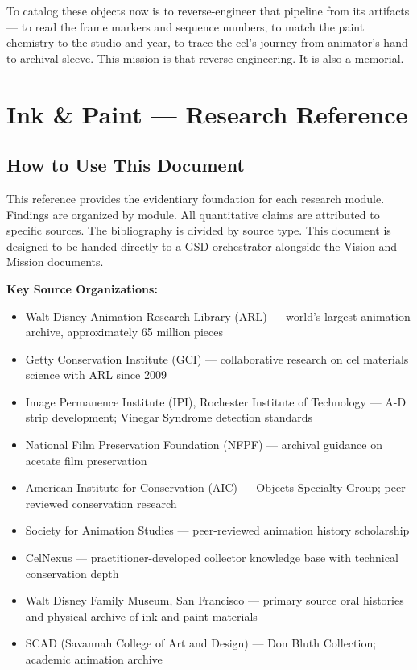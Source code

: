 \documentclass[11pt,letterpaper]{article}
\newcommand{\stageheader}[2]{%
  \noindent\colorbox{#2}{\makebox[\textwidth][l]{%
    \textcolor{white}{\bfseries\sffamily\hspace{6pt}#1\hspace{6pt}}}}%
  \vspace{0.5em}\par%
}
\begin{document}
To catalog these objects now is to reverse-engineer that pipeline from its artifacts --- to read the frame markers and sequence numbers, to match the paint chemistry to the studio and year, to trace the cel's journey from animator's hand to archival sleeve. This mission is that reverse-engineering. It is also a memorial.

\newpage

\stageheader{STAGE 2 --- RESEARCH REFERENCE}{secondary}

\section{Ink \& Paint --- Research Reference}

\subsection{How to Use This Document}

This reference provides the evidentiary foundation for each research module. Findings are organized by module. All quantitative claims are attributed to specific sources. The bibliography is divided by source type. This document is designed to be handed directly to a GSD orchestrator alongside the Vision and Mission documents.

\textbf{Key Source Organizations:}
\begin{itemize}
  \item Walt Disney Animation Research Library (ARL) --- world's largest animation archive, approximately 65 million pieces
  \item Getty Conservation Institute (GCI) --- collaborative research on cel materials science with ARL since 2009
  \item Image Permanence Institute (IPI), Rochester Institute of Technology --- A-D strip development; Vinegar Syndrome detection standards
  \item National Film Preservation Foundation (NFPF) --- archival guidance on acetate film preservation
  \item American Institute for Conservation (AIC) --- Objects Specialty Group; peer-reviewed conservation research
  \item Society for Animation Studies --- peer-reviewed animation history scholarship
  \item CelNexus --- practitioner-developed collector knowledge base with technical conservation depth
  \item Walt Disney Family Museum, San Francisco --- primary source oral histories and physical archive of ink and paint materials
  \item SCAD (Savannah College of Art and Design) --- Don Bluth Collection; academic animation archive
\end{itemize}
\end{document}
